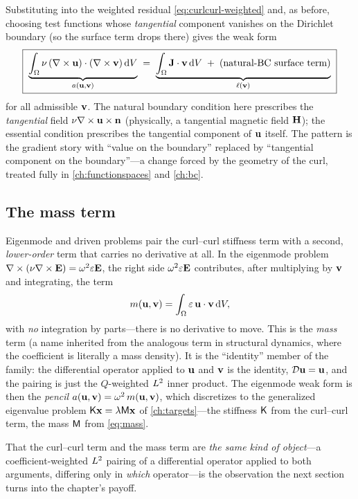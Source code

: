 Substituting into the weighted residual \cref{eq:curlcurl-weighted} and, as
before, choosing test functions whose \emph{tangential} component vanishes on the
Dirichlet boundary (so the surface term drops there) gives the weak form
\begin{equation}
  \boxed{\;
  \underbrace{\int_\Omega \nu\,(\nabla\times\mathbf{u})\cdot(\nabla\times\mathbf{v})\,\mathrm{d}V}_{a(\mathbf{u},\mathbf{v})}
  \;=\;
  \underbrace{\int_\Omega \mathbf{J}\cdot\mathbf{v}\,\mathrm{d}V \;+\;(\text{natural-BC surface term})}_{\ell(\mathbf{v})}
  \;}
  \label{eq:curlcurl-weak}
\end{equation}
for all admissible $\mathbf{v}$. The natural boundary condition here prescribes the
\emph{tangential} field $\nu\nabla\times\mathbf{u}\times\mathbf{n}$ (physically, a tangential
magnetic field $\mathbf{H}$); the essential condition prescribes the tangential
component of $\mathbf{u}$ itself. The pattern is the gradient story with ``value on the
boundary'' replaced by ``tangential component on the boundary''---a change forced
by the geometry of the curl, treated fully in \cref{ch:functionspaces} and
\cref{ch:bc}.

\subsection{The mass term}
\label{sec:mass}

Eigenmode and driven problems pair the curl--curl stiffness term with a second,
\emph{lower-order} term that carries no derivative at all. In the eigenmode
problem $\nabla\times(\nu\nabla\times\mathbf{E})=\omega^2\varepsilon\mathbf{E}$, the right side
$\omega^2\varepsilon\mathbf{E}$ contributes, after multiplying by $\mathbf{v}$ and integrating,
the term
\begin{equation}
  m(\mathbf{u},\mathbf{v}) = \int_\Omega \varepsilon\,\mathbf{u}\cdot\mathbf{v}\,\mathrm{d}V,
  \label{eq:mass}
\end{equation}
with \emph{no} integration by parts---there is no derivative to move. This is the
\emph{mass} term (a name inherited from the analogous term in structural
dynamics, where the coefficient is literally a mass density). It is the
``identity'' member of the family: the differential operator applied to $\mathbf{u}$ and
$\mathbf{v}$ is the identity, $\mathcal{D}\mathbf{u}=\mathbf{u}$, and the pairing is just the
$Q$-weighted $L^2$ inner product. The eigenmode weak form is then the
\emph{pencil} $a(\mathbf{u},\mathbf{v})=\omega^2\,m(\mathbf{u},\mathbf{v})$, which discretizes to the
generalized eigenvalue problem $\mathsf{K}\mathbf{x}=\lambda\mathsf{M}\mathbf{x}$ of
\cref{ch:targets}---the stiffness $\mathsf{K}$ from the curl--curl term, the mass
$\mathsf{M}$ from \cref{eq:mass}.

That the curl--curl term and the mass term are \emph{the same kind of object}---a
coefficient-weighted $L^2$ pairing of a differential operator applied to both
arguments, differing only in \emph{which} operator---is the observation the next
section turns into the chapter's payoff.

